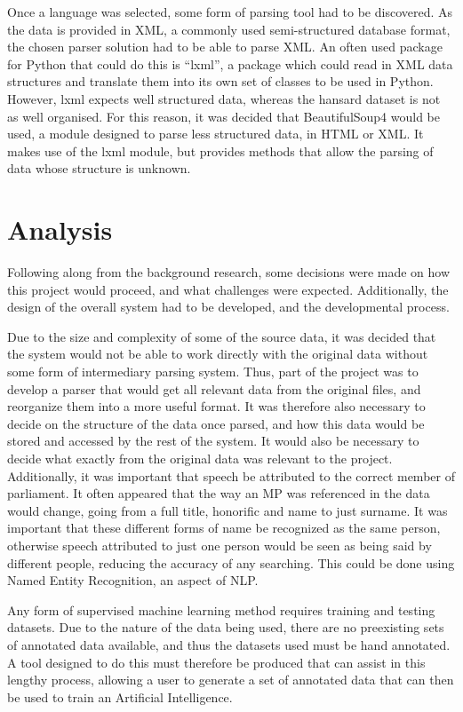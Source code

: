 Once a language was selected, some form of parsing tool had to be discovered. As the data is provided in XML, a commonly used semi-structured database format, the chosen parser solution had to be able to parse XML. An often used package for Python that could do this is “lxml”, a package which could read in XML data structures and translate them into its own set of classes to be used in Python. However, lxml expects well structured data, whereas the hansard dataset is not as well organised. For this reason, it was decided that BeautifulSoup4\cite{Richardson} would be used, a module designed to parse less structured data, in HTML or XML. It makes use of the lxml module, but provides methods that allow the parsing of data whose structure is unknown.

\section{Analysis}
\label{sec:bck_analysis}
Following along from the background research, some decisions were made on how this project would proceed, and what challenges were expected. Additionally, the design of the overall system had to be developed, and the developmental process.

Due to the size and complexity of some of the source data, it was decided that the system would not be able to work directly with the original data without some form of intermediary parsing system. Thus, part of the project was to develop a parser that would get all relevant data from the original files, and reorganize them into a more useful format. It was therefore also necessary to decide on the structure of the data once parsed, and how this data would be stored and accessed by the rest of the system. It would also be necessary to decide what exactly from the original data was relevant to the project.
Additionally, it was important that speech be attributed to the correct member of parliament. It often appeared that the way an MP was referenced in the data would change, going from a full title, honorific and name to just surname. It was important that these different forms of name be recognized as the same person, otherwise speech attributed to just one person would be seen as being said by different people, reducing the accuracy of any searching. This could be done using Named Entity Recognition, an aspect of NLP.

Any form of supervised machine learning method requires training and testing datasets. Due to the nature of the data being used, there are no preexisting sets of annotated data available, and thus the datasets used must be hand annotated. A tool designed to do this must therefore be produced that can assist in this lengthy process, allowing a user to generate a set of annotated data that can then be used to train an Artificial Intelligence.

